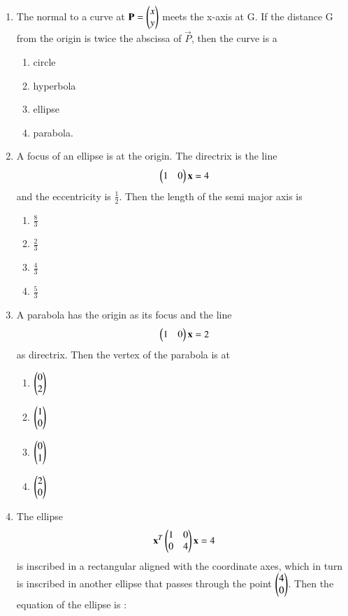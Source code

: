 \documentclass[journal,12pt,twocolumn]{IEEEtran}
\begin{document}
\begin{enumerate}[label=\arabic*]
    \item The normal to a curve at $\mathbf{P}=\begin{pmatrix}x\\y\end{pmatrix}$ meets the x-axis at G. If the distance G from the origin is twice the abscissa of $\vec{P}$, then the curve is a
    \begin{enumerate}
    \item circle
    \item hyperbola 
    \item ellipse
    \item parabola. 
    \end{enumerate}
    \item A focus of an ellipse is at the origin. The directrix is the line 
    \begin{align}
    \begin{pmatrix}1&0\end{pmatrix}\mathbf{x}=4
    \end{align} and the eccentricity is $\frac{1}{2}$. Then the length of the semi major axis is 
    \begin{enumerate}
    \item $\frac{8}{3}$
    \item $\frac{2}{3}$
    \item $\frac{4}{3}$
    \item $\frac{5}{3}$
    \end{enumerate}
    \item A parabola has the origin as its focus and the line
    \begin{align}
    \begin{pmatrix}1&0\end{pmatrix}\mathbf{x}=2
    \end{align} as directrix. Then the vertex of the parabola is at 
    \begin{enumerate}
    \item $\begin{pmatrix}0\\2\end{pmatrix}$
    \item $\begin{pmatrix}1\\0\end{pmatrix}$ 
    \item $\begin{pmatrix}0\\1\end{pmatrix}$
    \item $\begin{pmatrix}2\\0\end{pmatrix}$ 
    \end{enumerate}
    \item The ellipse
    \begin{align}
    \mathbf{x}^T\begin{pmatrix}1&0\\0&4\end{pmatrix}\mathbf{x}=4
    \end{align} is inscribed in a rectangular aligned with the coordinate axes, which in turn is inscribed in another ellipse that passes through the point $\begin{pmatrix}4\\0\end{pmatrix}$. Then the equation of the ellipse is :

\end{enumerate}
\end{document}
